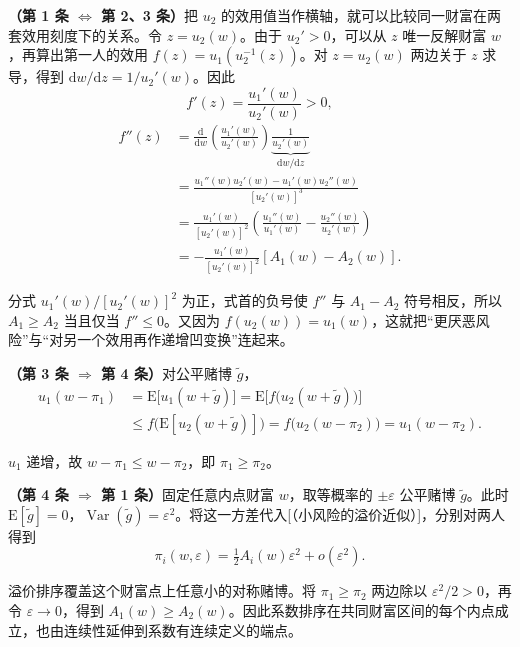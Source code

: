 \begin{solution}[label-content={证明},blank-type=none]
\textbf{（第 1 条 $\Leftrightarrow$ 第 2、3 条）}把 $u_2$ 的效用值当作横轴，就可以比较同一财富在两套效用刻度下的关系。令 $z=u_2(w)$。由于 $u_2'>0$，可以从 $z$ 唯一反解财富 $w$，再算出第一人的效用 $f(z)=u_1(u_2^{-1}(z))$。对 $z=u_2(w)$ 两边关于 $z$ 求导，得到 $\mathrm dw/\mathrm dz=1/u_2'(w)$。因此
\[
 f'(z)=\frac{u_1'(w)}{u_2'(w)}>0,
\]
\[
\begin{aligned}
 f''(z)
 &=\frac{\mathrm d}{\mathrm dw}\left(\frac{u_1'(w)}{u_2'(w)}\right)
   \underbrace{\frac{1}{u_2'(w)}}_{\mathrm dw/\mathrm dz}\\
 &=\frac{u_1''(w)u_2'(w)-u_1'(w)u_2''(w)}{[u_2'(w)]^3}\\
 &=\frac{u_1'(w)}{[u_2'(w)]^2}
 \left(\frac{u_1''(w)}{u_1'(w)}-\frac{u_2''(w)}{u_2'(w)}\right)\\
 &=-\frac{u_1'(w)}{[u_2'(w)]^2}[A_1(w)-A_2(w)].
\end{aligned}
\]

分式 $u_1'(w)/[u_2'(w)]^2$ 为正，式首的负号使 $f''$ 与 $A_1-A_2$ 符号相反，所以 $A_1\ge A_2$ 当且仅当 $f''\le0$。又因为 $f(u_2(w))=u_1(w)$，这就把“更厌恶风险”与“对另一个效用再作递增凹变换”连起来。

\textbf{（第 3 条 $\Rightarrow$ 第 4 条）}对公平赌博 $\tilde g$，
\begin{align*}
    u_1(w-\pi_1)
    &=\mathrm{E}\bigl[u_1(w+\tilde{g})\bigr]
    =\mathrm{E}\bigl[f\bigl(u_2(w+\tilde{g})\bigr)\bigr]\\
    &\le f\bigl(\mathrm{E}[u_2(w+\tilde{g})]\bigr)
    =f\bigl(u_2(w-\pi_2)\bigr)
    =u_1(w-\pi_2).
\end{align*}

$u_1$ 递增，故 $w-\pi_1\le w-\pi_2$，即 $\pi_1\ge\pi_2$。

\textbf{（第 4 条 $\Rightarrow$ 第 1 条）}固定任意内点财富 $w$，取等概率的 $\pm\varepsilon$ 公平赌博 $\tilde g$。此时 $\mathrm E[\tilde g]=0$，$\operatorname{Var}(\tilde g)=\varepsilon^2$。将这一方差代入[（小风险的溢价近似）]，分别对两人得到
\[
 \pi_i(w,\varepsilon)=\tfrac12A_i(w)\varepsilon^2+o(\varepsilon^2).
\]

溢价排序覆盖这个财富点上任意小的对称赌博。将 $\pi_1\ge\pi_2$ 两边除以 $\varepsilon^2/2>0$，再令 $\varepsilon\to0$，得到 $A_1(w)\ge A_2(w)$。因此系数排序在共同财富区间的每个内点成立，也由连续性延伸到系数有连续定义的端点。
\end{solution}

